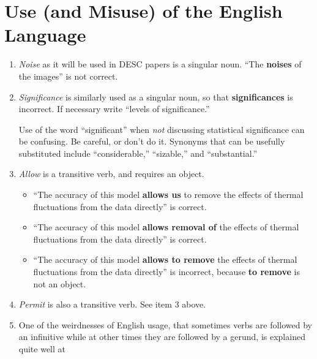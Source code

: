 \documentclass[letterpaper,11pt]{article}
\begin{document}
\section{Use (and Misuse) of the English Language}


\begin{enumerate}

\item {\it Noise\/} as it will be used in DESC papers is a singular noun.  ``The {\bf noises} of
the images'' is not correct.

\item
 {\it Significance\/} is similarly used as a singular noun, so that
{\bf significances} is incorrect.  If necessary write ``levels of
significance.''

Use of the word ``significant'' when {\it not\/} discussing statistical
significance can be confusing.  Be careful, or don't do it.  Synonyms that
can be usefully substituted include ``considerable,'' ``sizable,'' and
``substantial.''

\item {\it Allow\/} is a transitive verb, and requires an object.

\begin{itemize}
\item``The accuracy of this model {\bf allows us} to remove the effects
of thermal fluctuations from the data directly'' is correct.

\item``The accuracy of this model {\bf allows removal of} the effects of
thermal fluctuations from the data directly'' is correct.

\item``The accuracy of this model {\bf allows to remove} the effects of
thermal fluctuations from the data directly'' is incorrect, because
{\bf to remove} is not an object.
\end{itemize}

\item {\it Permit\/} is also a transitive verb.  See item 3 above.

\item One of the weirdnesses of English usage, that sometimes verbs are
followed by an infinitive while at other times they are followed by a gerund,
is explained quite well at


\end{enumerate}
\end{document}

